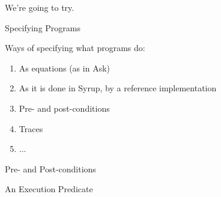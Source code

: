 \documentclass[xetex,aspectratio=169,14pt,hyperref={pdfpagelabels=true,pdflang={en-GB}}]{beamer}
\begin{document}
\begin{frame}

  We're going to try. \\
\end{frame}



\begin{frame}
  {Specifying Programs}

  Ways of specifying what programs do:
  \begin{enumerate}
  \item As equations (as in Ask)
  \item As it is done in Syrup, by a reference implementation
  \item Pre- and post-conditions
  \item Traces
  \item ...
  \end{enumerate}
\end{frame}

\begin{frame}
  {Pre- and Post-conditions}


\end{frame}

\begin{frame}
  {An Execution Predicate}
\end{frame}


\weeksection{}
\end{document}
